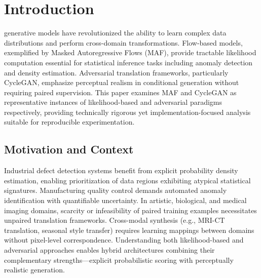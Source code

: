 \documentclass[conference]{IEEEtran}
\begin{document}
\section{Introduction}
 generative models have revolutionized the ability to learn complex data distributions and perform cross-domain transformations. Flow-based models, exemplified by Masked Autoregressive Flows (MAF), provide tractable likelihood computation essential for statistical inference tasks including anomaly detection and density estimation. Adversarial translation frameworks, particularly CycleGAN, emphasize perceptual realism in conditional generation without requiring paired supervision. This paper examines MAF and CycleGAN as representative instances of likelihood-based and adversarial paradigms respectively, providing technically rigorous yet implementation-focused analysis suitable for reproducible experimentation.

\subsection{Motivation and Context}
Industrial defect detection systems benefit from explicit probability density estimation, enabling prioritization of data regions exhibiting atypical statistical signatures. Manufacturing quality control demands automated anomaly identification with quantifiable uncertainty. In artistic, biological, and medical imaging domains, scarcity or infeasibility of paired training examples necessitates unpaired translation frameworks. Cross-modal synthesis (e.g., MRI-CT translation, seasonal style transfer) requires learning mappings between domains without pixel-level correspondence. Understanding both likelihood-based and adversarial approaches enables hybrid architectures combining their complementary strengths—explicit probabilistic scoring with perceptually realistic generation.
\end{document}
